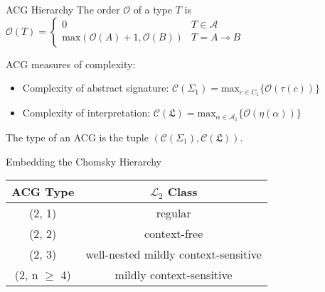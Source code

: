 \documentclass{beamer}
\newcommand{\li}{\!\multimap\!}
\begin{document}
\begin{frame}{ACG Hierarchy}
	\small
	{\footnotesize
	The \alert{order} $\mathcal{O}$ of a type $T$ is 
	$\mathcal{O}(T) = 
			\begin{cases}
				0 & T \in \mathcal{A} \\ 
				\mathrm{max}\left( {\mathcal{O}(A) + 1, \mathcal{O}(B)} \right)
				& T = A\li B
	\end{cases}$}
	\vfill	
	
	\pause
	ACG \alert{measures of complexity}:
	\begin{itemize}
		\item Complexity of abstract signature:
			$\mathcal{C}(\Sigma_1) = \mathrm{max}_{c\in {C_1}}\{\mathcal{O}\left(\tau\left(c\right)\right)\}$
		\item Complexity of interpretation:
			$\mathcal{C}(\mathfrak{L}) = \mathrm{max}_{\alpha \in \mathcal{A}_1}\{ \mathcal{O}\left(\eta\left(\alpha\right)\right)\}$
	\end{itemize}
	\begin{flushright}
	The \alert{type} of an ACG is the tuple $\left(\mathcal{C}(\Sigma_1), \mathcal{C}(\mathfrak{L}) \right)$.
	\end{flushright}
	\vfill

	\pause
	\alert{Embedding the Chomsky Hierarchy} \\
	\vfill	
	\centering
	\begin{tabularx}{0.7\textwidth}{cc}
		ACG Type & $\mathcal{L}_2$ Class\\
		\midrule
		(2, 1) & regular\\
		(2, 2) & context-free\\
		(2, 3) & well-nested mildly context-sensitive\\
		(2, n $\geq$ 4) & mildly context-sensitive
	\end{tabularx}
	\vfill
	
\end{frame}
\end{document}

